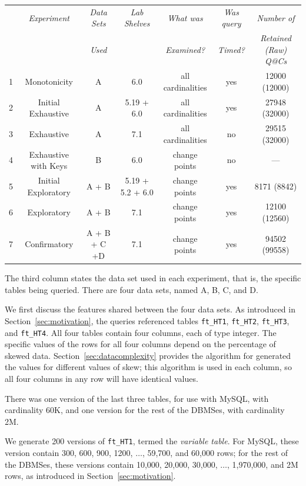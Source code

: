 \documentclass[prodmode,acmtods]{acmsmall}
\begin{document}
\begin{table}[t]
{%
\resizebox{140mm}{!}
{
\begin{tabular}{c|c|c|c|c|c|c}
& {\em Experiment}& {\em Data Sets} & {\em Lab Shelves} & {\em What was} &{\em Was query}&{\em Number of}\\
&                 & {\em Used}      &                   & {\em Examined?}&{\em Timed?}   &{\em Retained (Raw) Q@Cs}\\
\hline
1 & Monotonicity 	& A & 6.0     &all cardinalities&yes& 12000 (12000)\\
2 & Initial Exhaustive 	& A & 5.19 + 6.0&all cardinalities&yes& 27948 (32000)\\
3 & Exhaustive 		& A & 7.1     &all cardinalities&no & 29515 (32000)\\
4 & Exhaustive with Keys & B& 6.0     &change points&no& --- \\
5 & Initial Exploratory & A + B&5.19 + 5.2 + 6.0&change points&yes& 8171 (8842)\\
6 & Exploratory 	& A + B&7.1   &change points&yes& 12100 (12560)\\
7 & Confirmatory 	&A + B + C +D&7.1&change points&yes& 94502 (99558)\\
\end{tabular}
}
}
\end{table}

The third column states the data set used in each experiment, that is, the
specific tables being queried. There are four data sets, named A, B, C, and
D.

We first discuss the features shared between the four data sets. As introduced in
Section~\ref{sec:motivation}, the queries referenced tables {\tt ft\_HT1},
{\tt ft\_HT2}, {\tt ft\_HT3}, and {\tt ft\_HT4}. All four tables contain four
columns, each of type integer. The specific values of the
rows for all four columns depend on the percentage of skewed
data. Section~\ref{sec:datacomplexity} provides the algorithm for generated the
values for different values of skew; this algorithm is used in each column,
so all four columns in any row will have identical values.

There was one version of the
last three tables, for use with MySQL, with cardinality 60K, and one version
for the rest of the DBMSes, with cardinality 2M.

We generate 200 versions of {\tt ft\_HT1}, termed the {\em variable table}. For MySQL, these version contain
300, 600, 900, 1200, $\ldots$, 59,700, and 60,000 rows; for the rest of the
DBMSes, these versions contain 10,000, 20,000, 30,000, $\ldots$, 1,970,000,
and 2M rows, as introduced in Section~\ref{sec:motivation}.
\end{document}
